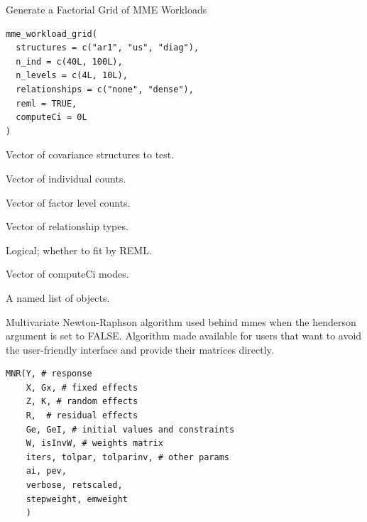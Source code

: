 \documentclass[a4paper]{book}
\begin{document}
%
\begin{Description}\relax
Generate a Factorial Grid of MME Workloads
\end{Description}
%
\begin{Usage}
\begin{verbatim}
mme_workload_grid(
  structures = c("ar1", "us", "diag"),
  n_ind = c(40L, 100L),
  n_levels = c(4L, 10L),
  relationships = c("none", "dense"),
  reml = TRUE,
  computeCi = 0L
)
\end{verbatim}
\end{Usage}
%
\begin{Arguments}
\begin{ldescription}
\item[\code{structures}] Vector of covariance structures to test.

\item[\code{n\_ind}] Vector of individual counts.

\item[\code{n\_levels}] Vector of factor level counts.

\item[\code{relationships}] Vector of relationship types.

\item[\code{reml}] Logical; whether to fit by REML.

\item[\code{computeCi}] Vector of computeCi modes.
\end{ldescription}
\end{Arguments}
%
\begin{Value}
A named list of  objects.
\end{Value}
%
\begin{Description}\relax
Multivariate Newton-Raphson algorithm used behind mmes when the henderson argument 
is set to FALSE. Algorithm made available for users that want to avoid the user-friendly interface 
and provide their matrices directly.
\end{Description}
%
\begin{Usage}
\begin{verbatim}
MNR(Y, # response
    X, Gx, # fixed effects
    Z, K, # random effects
    R,  # residual effects
    Ge, GeI, # initial values and constraints
    W, isInvW, # weights matrix
    iters, tolpar, tolparinv, # other params
    ai, pev,
    verbose, retscaled,
    stepweight, emweight
    )
\end{verbatim}
\end{Usage}
\end{document}
